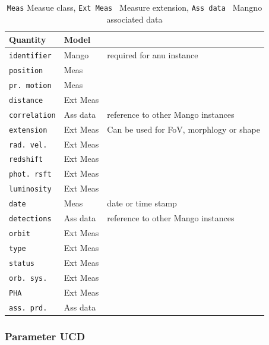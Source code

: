 \documentclass[11pt,a4paper]{ivoa}
\begin{document}
\begin{table}[ht!]
     \tiny
     \begin{tabular}{|p{2.4cm}|p{1.8cm}|p{7cm}|}
       \hline Quantity &  Model &  \\
       \hline  \texttt{identifier}      & Mango & required for anu instance\\                    
       \hline  \texttt{position}      &  Meas &  \\       
       \hline  \texttt{pr. motion}   & Meas &     \\       
       \hline  \texttt{distance}     & Ext Meas &     \\       
       \hline  \texttt{correlation}   & Ass data & reference to other Mango instances     \\       
       \hline  \texttt{extension}     & Ext Meas & Can be used for FoV, morphlogy or shape\\       
       \hline  \texttt{rad. vel.}       &  Ext Meas  &       \\       
       \hline  \texttt{redshift}        &   Ext Meas  &  \\             
       \hline  \texttt{phot. rsft}      & Ext Meas&    \\       
       \hline  \texttt{luminosity}    & Ext Meas&\\       
       \hline  \texttt{date}             & Meas & date or time stamp\\       
       \hline  \texttt{detections}    & Ass data & reference to other Mango instances   \\       
       \hline  \texttt{orbit}             & Ext Meas&      \\       
       \hline  \texttt{type}             &Ext Meas&     \\      
       \hline  \texttt{status}          &Ext Meas&     \\       
       \hline  \texttt{orb. sys.}      &Ext Meas&     \\       
       \hline  \texttt{PHA}            &Ext Meas&     \\       
       \hline  \texttt{ass. prd.}     &Ass data&  \\       
       \hline 
     \end{tabular}
     \caption{ \texttt{Meas} Measue class, \texttt{Ext Meas } Measure extension, \texttt{Ass data  } Mangno associated data} 
 \end{table}


\subsubsection{Parameter UCD}
\end{document}
